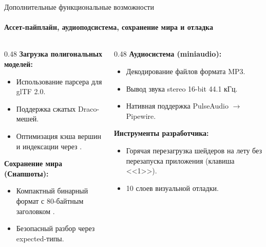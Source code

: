 \begin{frame}{Дополнительные функциональные возможности}
  \framesubtitle{Ассет-пайплайн, аудиоподсистема, сохранение мира и отладка}
  \begin{columns}[T]
    \begin{column}{0.48\textwidth}
      \textbf{Загрузка полигональных моделей:}
      \begin{itemize}
        \item Использование парсера  для glTF 2.0.
        \item Поддержка сжатых Draco-мешей.
        \item Оптимизация кэша вершин и индексации через .
      \end{itemize}
      \vspace{0.5em}
      \textbf{Сохранение мира (Снапшоты):}
      \begin{itemize}
        \item Компактный бинарный формат с 80-байтным заголовком .
        \item Безопасный разбор через expected-типы.
      \end{itemize}
    \end{column}
    \begin{column}{0.48\textwidth}
      \textbf{Аудиосистема (miniaudio):}
      \begin{itemize}
        \item Декодирование файлов формата MP3.
        \item Вывод звука stereo 16-bit 44.1 кГц.
        \item Нативная поддержка PulseAudio $\to$ Pipewire.
      \end{itemize}
      \vspace{0.5em}
      \textbf{Инструменты разработчика:}
      \begin{itemize}
        \item Горячая перезагрузка шейдеров на лету без перезапуска приложения (клавиша <<1>>).
        \item 10 слоев визуальной отладки.
      \end{itemize}
    \end{column}
  \end{columns}
\end{frame}

